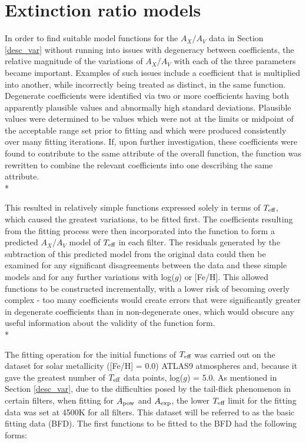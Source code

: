 \documentclass[12pt, a4paper]{report}
\begin{document}
\section{Extinction ratio models} \label{ext_models}
In order to find suitable model functions for the $A_{X}/A_{V}$ data in Section \ref{desc_var} without running into issues with degeneracy between coefficients, the relative magnitude of the variations of $A_{X}/A_{V}$ with each of the three parameters became important. Examples of such issues include a coefficient that is multiplied into another, while incorrectly being treated as distinct, in the same function. Degenerate coefficients were identified via two or more coefficients having both apparently plausible values and abnormally high standard deviations. Plausible values were determined to be values which were not at the limits or midpoint of the acceptable range set prior to fitting and which were produced consistently over many fitting iterations. If, upon further investigation, these coefficients were found to contribute to the same attribute of the overall function, the function was rewritten to combine the relevant coefficients into one describing the same attribute.\\*

This resulted in relatively simple functions expressed solely in terms of $T_{\textnormal{eff}}$, which caused the greatest variations, to be fitted first. The coefficients resulting from the fitting process were then incorporated into the function to form a predicted $A_{X}/A_{V}$ model of $T_{\textnormal{eff}}$ in each filter. The residuals generated by the subtraction of this predicted model from the original data could then be examined for any significant disagreements between the data and these simple models and for any further variations with log($g$) or [Fe/H]. This allowed functions to be constructed incrementally, with a lower risk of becoming overly complex - too many coefficients would create errors that were significantly greater in degenerate coefficients than in non-degenerate ones, which would obscure any useful information about the validity of the function form. \\*

The fitting operation for the initial functions of $T_{\textnormal{eff}}$ was carried out on the dataset for solar metallicity ([Fe/H] = 0.0) ATLAS9 atmospheres and, because it gave the greatest number of $T_{\textnormal{eff}}$ data points, log($g$) = 5.0. As mentioned in Section \ref{desc_var}, due to the difficulties posed by the tail-flick phenomenon in certain filters, when fitting for $A_{\textnormal{pow}}$ and $A_{\textnormal{exp}}$, the lower $T_{\textnormal{eff}}$ limit for the fitting data was set at 4500K for all filters. This dataset will be referred to as the basic fitting data (BFD). The first functions to be fitted to the BFD had the following forms:
\end{document}
